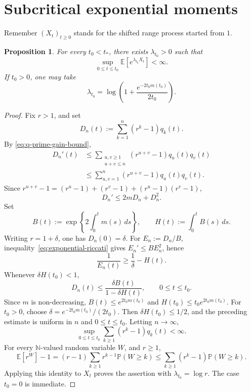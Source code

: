 \documentclass[11pt,a4paper]{amsart}
\newtheorem{proposition}[theorem]{Proposition}
\theoremstyle{remark}
\newcommand{\N}{\mathbb N}
\begin{document}
\section{Subcritical exponential moments}
\label{sec:exponential-moments}
Remember $(X_t)_{t\geq 0}$ stands for the shifted range process started from $1$.
\begin{proposition}
\label{prop:exponential-moments}
For every \(t_0<t_*\), there exists \(\lambda_{t_0}>0\) such that
\[
        \sup_{0\leq t\leq t_0}\mathbb{E}[e^{\lambda_{t_0}X_t}]<\infty.
\]
If \(t_0>0\), one may take
\begin{equation}
\label{eq:explicit-lambda}
        \lambda_{t_0}
        =
        \log\left(1+\frac{e^{-2t_0m(t_0)}}{2t_0}\right).
\end{equation}
\end{proposition}

\begin{proof}
Fix \(r>1\), and set
\[
        D_n(t):=\sum_{k=1}^n(r^k-1)q_k(t).
\]
By \eqref{eq:q-prime-gain-bound},
\[
\begin{aligned}
        D_n'(t)
        &\leq
        \sum_{\substack{u,v\geq1\\u+v\leq n}}
        (r^{u+v}-1)q_u(t)q_v(t)\\
        &\leq
        \sum_{u,v=1}^n(r^{u+v}-1)q_u(t)q_v(t).
\end{aligned}
\]
Since
\(r^{u+v}-1=(r^u-1)+(r^v-1)+(r^u-1)(r^v-1)\),
\begin{equation}
\label{eq:exponential-riccati}
        D_n'\leq2mD_n+D_n^2.
\end{equation}
Set
\[
        B(t):=\exp\left\{2\int_0^tm(s)\,ds\right\},
        \qquad
        H(t):=\int_0^tB(s)\,ds.
\]
Writing \(r=1+\delta\), one has \(D_n(0)=\delta\). For
\(E_n:=D_n/B\), inequality~\eqref{eq:exponential-riccati} gives
\(E_n'\leq BE_n^2\), hence
\[
        \frac1{E_n(t)}\geq\frac1\delta-H(t).
\]
Whenever \(\delta H(t_0)<1\),
\[
        D_n(t)
        \leq
        \frac{\delta B(t)}{1-\delta H(t)},
        \qquad 0\leq t\leq t_0.
\]
Since \(m\) is non-decreasing,
\(B(t)\leq e^{2t_0m(t_0)}\) and
\(H(t_0)\leq t_0e^{2t_0m(t_0)}\). For \(t_0>0\), choose
\(\delta=e^{-2t_0m(t_0)}/(2t_0)\). Then
\(\delta H(t_0)\leq1/2\), and the preceding estimate is uniform in \(n\)
and \(0\leq t\leq t_0\). Letting \(n\to\infty\),
\[
        \sup_{0\leq t\leq t_0}
        \sum_{k\geq1}(r^k-1)q_k(t)<\infty.
\]
For every \(\N\)-valued random variable \(W\), and $r\geq 1$,
\begin{equation}
\label{eq:generic-W}
        \mathbb{E}[r^W]-1
        =
        (r-1)\sum_{k\geq1}r^{k-1}\mathbb{P}(W\geq k)  \leq
        \sum_{k\geq1}(r^k-1) \mathbb{P}(W\geq k).
\end{equation}
Applying this identity to \(X_t\) proves the assertion with
\(\lambda_{t_0}=\log r\). The case \(t_0=0\) is immediate.
\end{proof}
\end{document}
